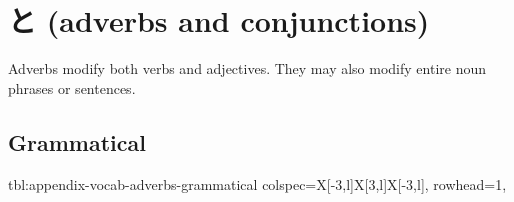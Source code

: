\documentclass[../nihongo-gakushuu-kyouzai-vocabulary.tex]{subfiles}
\begin{document}
\appendix
\setcounter{section}{4}

\section{と (adverbs and conjunctions)}
Adverbs modify both verbs and adjectives. They may also modify entire noun phrases or sentences.


\subsection{Grammatical}
{tbl:appendix-vocab-adverbs-grammatical}  %
{}  %
{
    colspec={X[-3,l]X[3,l]X[-3,l]},
    rowhead=1,
}  %
\end{document}
